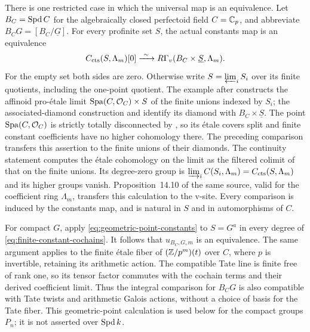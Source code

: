 There is one restricted case in which the universal map is an
equivalence.  Let $B_C=\operatorname{Spd} C$ for the algebraically closed perfectoid
field $C=\mathbb C_p$, and abbreviate $B_CG=[B_C/\underline G]$.
For every profinite set $S$, the actual constants map
is an equivalence
\begin{equation}\label{eq:geometric-point-constants}
 C_{\mathrm{cts}}(S,\Lambda_m)[0]\xrightarrow{\ \sim\ }
       R\Gamma_v(B_C\times\underline S,\Lambda_m).
\end{equation}
For the empty set both sides are zero.  Otherwise write $S=\varprojlim_i S_i$
over its finite quotients, including the one-point quotient.  The example
after \cite[Definition~7.8]{ScholzeDiamonds} constructs the affinoid
pro-\'etale limit $\operatorname{Spa}(C,\mathcal O_C)\times S$ of the finite
unions indexed by $S_i$; the associated-diamond construction and
\cite[Example~11.12 and Lemma~15.2]{ScholzeDiamonds} identify its
diamond with $B_C\times\underline S$.
The point $\operatorname{Spa}(C,\mathcal O_C)$ is strictly totally disconnected
by \cite[Definition~7.15 and Proposition~7.16]{ScholzeDiamonds}, so its
\'etale covers split and finite constant coefficients have no higher
cohomology there.  The preceding \cite[Lemma~15.6]{ScholzeDiamonds}
comparison transfers this assertion to the finite unions of their
diamonds.  The continuity statement
\cite[Proposition~14.9]{ScholzeDiamonds} computes the \'etale
cohomology on the limit as the filtered colimit of that on the finite
unions.  Its degree-zero group is
$\varinjlim_i C(S_i,\Lambda_m)=C_{\mathrm{cts}}(S,\Lambda_m)$ and its higher
groups vanish.  Proposition~14.10 of the same source, valid for the
coefficient ring $\Lambda_m$, transfers this calculation to the v-site.
Every comparison is induced by the constants map, and is natural in
$S$ and in automorphisms of $C$.

For compact $G$, apply \eqref{eq:geometric-point-constants} to
$S=G^a$ in every degree of \eqref{eq:finite-constant-cochains}.
It follows that $u_{B_C,G,m}$ is an equivalence.  The same argument
applies to the finite \'etale fiber of $(\mathbb Z/p^m)(t)$ over $C$,
where $p$ is invertible, retaining its arithmetic action.  The
compatible Tate line is finite free of rank one, so its tensor factor
commutes with the cochain terms and their derived coefficient limit.
Thus the integral comparison for
$B_CG$ is also compatible with Tate twists and arithmetic Galois
actions, without a choice of basis for the Tate fiber.  This
geometric-point calculation is used below for the compact groups
$P_n$; it is not asserted over $\operatorname{Spd} k$.

